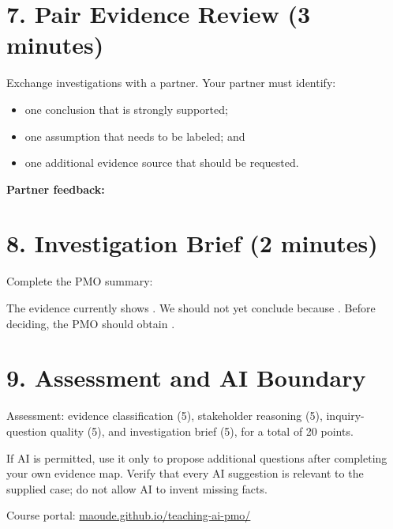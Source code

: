\documentclass[11pt,a4paper]{article}
\begin{document}
\vspace{9mm}\blankline

\section{7. Pair Evidence Review (3 minutes)}

Exchange investigations with a partner. Your partner must identify:

\begin{itemize}
  \item one conclusion that is strongly supported;
  \item one assumption that needs to be labeled; and
  \item one additional evidence source that should be requested.
\end{itemize}

\textbf{Partner feedback:}

\vspace{10mm}\blankline

\section{8. Investigation Brief (2 minutes)}

Complete the PMO summary:

\begin{activitybox}
The evidence currently shows \underline{\hspace{5cm}}. We should not yet conclude \underline{\hspace{4cm}} because \underline{\hspace{4cm}}. Before deciding, the PMO should obtain \underline{\hspace{5cm}}.
\end{activitybox}

\section{9. Assessment and AI Boundary}

Assessment: evidence classification (5), stakeholder reasoning (5), inquiry-question quality (5), and investigation brief (5), for a total of 20 points.

If AI is permitted, use it only to propose additional questions after completing your own evidence map. Verify that every AI suggestion is relevant to the supplied case; do not allow AI to invent missing facts.

\vfill
\begin{center}\small\color{pmoTeal}Course portal: \href{https://maoude.github.io/teaching-ai-pmo/}{maoude.github.io/teaching-ai-pmo/}\end{center}
\end{document}
